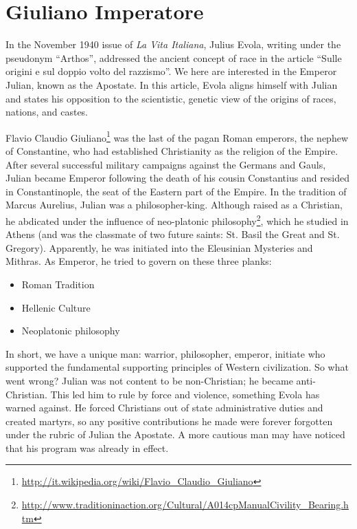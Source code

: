 \section{Giuliano Imperatore}
\begin{quotex}
In the November 1940 issue of \emph{La Vita Italiana}, Julius Evola, writing under the pseudonym ``Arthos'', addressed the ancient concept of race in the article ``Sulle origini e sul doppio volto del razzismo''. We here are interested in the Emperor Julian, known as the Apostate. In this article, Evola aligns himself with Julian and states his opposition to the scientistic, genetic view of the origins of races, nations, and castes.
\end{quotex}

Flavio Claudio Giuliano\footnote{\url{http://it.wikipedia.org/wiki/Flavio\_Claudio\_Giuliano}} was the last of the pagan Roman emperors, the nephew of Constantine, who had established Christianity as the religion of the Empire. After several successful military campaigns against the Germans and Gauls, Julian became Emperor following the death of his cousin Constantius and resided in Constantinople, the seat of the Eastern part of the Empire. In the tradition of Marcus Aurelius, Julian was a philosopher-king. Although raised as a Christian, he abdicated under the influence of neo-platonic philosophy\footnote{\url{http://www.traditioninaction.org/Cultural/A014cpManualCivility\_Bearing.htm}}, which he studied in Athens (and was the classmate of two future saints: St. Basil the Great and St. Gregory). Apparently, he was initiated into the Eleusinian Mysteries and Mithras. As Emperor, he tried to govern on these three planks:

\begin{itemize}


\item Roman Tradition

\item Hellenic Culture

\item Neoplatonic philosophy
\end{itemize}


In short, we have a unique man: warrior, philosopher, emperor, initiate who supported the fundamental supporting principles of Western civilization. So what went wrong? Julian was not content to be non-Christian; he became anti-Christian. This led him to rule by force and violence, something Evola has warned against. He forced Christians out of state administrative duties and created martyrs, so any positive contributions he made were forever forgotten under the rubric of Julian the Apostate. A more cautious man may have noticed that his program was already in effect.

